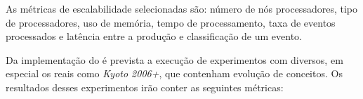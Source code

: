 


As métricas de escalabilidade selecionadas são: número de nós processadores,
tipo de processadores, uso de memória, tempo de processamento, taxa de eventos
processados e latência entre a produção e classificação de um evento.



Da implementação do \mfog é prevista a execução de experimentos com \datasets
diversos, em especial os \datasets reais como \emph{Kyoto 2006+},
que contenham evolução de conceitos.
Os resultados desses experimentos irão conter as seguintes métricas:

